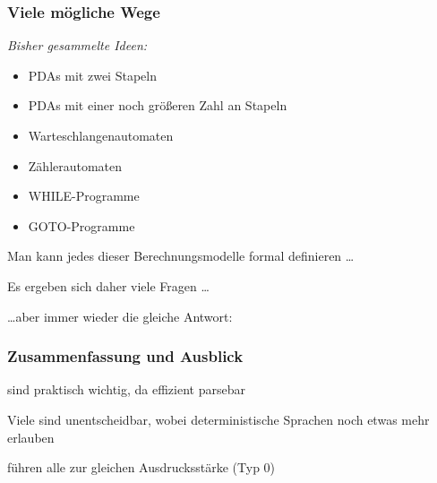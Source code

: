 \documentclass[onlymath]{beamer}
\begin{document}
\begin{frame}\frametitle{Viele mögliche Wege}

\emph{Bisher gesammelte Ideen:}
\begin{itemize}
\item PDAs mit zwei Stapeln
\item PDAs mit einer noch größeren Zahl an Stapeln
\item Warteschlangenautomaten
\item Zählerautomaten
\item WHILE-Programme
\item GOTO-Programme
\end{itemize}

Man kann jedes dieser Berechnungsmodelle formal definieren \ldots\medskip\pause

Es ergeben sich daher viele Fragen \ldots

\pause

\ldots aber immer wieder die gleiche Antwort\pause:\\[1ex]
\narrowcentering{{\Large\textcolor{purple}{Genau die Typ-0-Sprachen.}}}



\end{frame}

\begin{frame}\frametitle{Zusammenfassung und Ausblick}

 sind praktisch wichtig, da effizient parsebar 
\bigskip

Viele  sind unentscheidbar, wobei deterministische Sprachen noch etwas mehr erlauben
\bigskip

 führen alle zur gleichen Ausdrucksstärke (Typ 0)
\bigskip


\end{frame}
\end{document}
